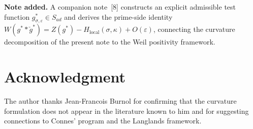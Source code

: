 \documentclass[11pt]{article}
\begin{document}
\medskip
\textbf{Note added.} A companion note~[8] constructs an explicit
admissible test function $g^*_{\sigma,\varepsilon}\in S_{ad}$
and derives the prime-side identity
$W(g^*\ast\check{g}^*) = Z(g^*) - H_{\mathrm{local}}(\sigma,\kappa)
+ O(\varepsilon)$, connecting the curvature decomposition of the
present note to the Weil positivity framework.

\section*{Acknowledgment}
The author thanks Jean-Francois Burnol for confirming that the curvature formulation does not appear in the literature known to him and for suggesting connections to Connes' program and the Langlands framework.
\end{document}
